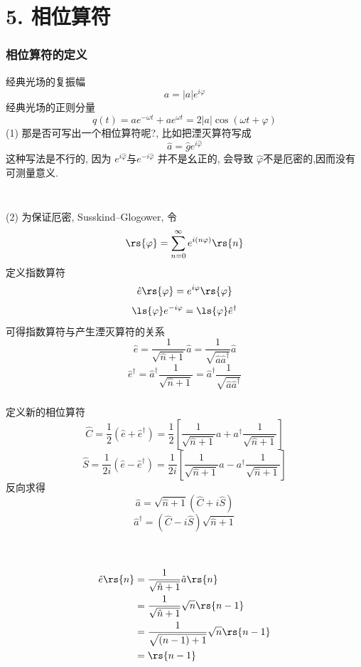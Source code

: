 \section{5. 相位算符}

\begin{frame} 
  \frametitle{相位算符的定义}
       经典光场的复振幅 
       \[ a= \left|a\right| e^{i\varphi}\]
       经典光场的正则分量
       \[ q(t) = a e^{-\omega t} + a e^{\omega t} = 2\left|a \right|\cos(\omega t + \varphi)\]
       (1) 那是否可写出一个相位算符呢?, 比如把湮灭算符写成
       \[ \hat{a} = \hat{g} e ^ {i \hat{\varphi}} \]
       这种写法是不行的, 因为
       $e ^ {i \hat{\varphi}}$与$e ^ {-i \hat{\varphi}}$ 并不是幺正的, 会导致 $\hat{\varphi}$不是厄密的,因而没有可测量意义. 
\end{frame}

\begin{frame} 
    \frametitle{}
    ~\\
       (2) 为保证厄密, Susskind–Glogower, 令
       \[ \rs{\varphi} = \sum_ {n=0} ^ \infty e^{i (n\varphi)} \rs{n} \]
       定义指数算符
       \[ \hat {e} \rs{\varphi}= e^{i {\varphi}}\rs{\varphi} \] 
        \[ \ls{\varphi}  e^{-i {\varphi}} = \ls{\varphi} \hat{e}^{\dagger}\]
      可得指数算符与产生湮灭算符的关系
      \[ \hat {e} = \frac{1}{\sqrt{\hat{n}+1}} \hat {a} =  \frac{1}{\sqrt{\hat {a}\hat {a}^{\dagger}}} \hat {a} \] 
      \[ \hat {e}^{\dagger} = \hat {a}^{\dagger} \frac{1}{\sqrt{\hat{n}+1}} = \hat {a}^{\dagger} \frac{1}{\sqrt{\hat {a}\hat {a}^{\dagger}}}  \] 
\end{frame}

\begin{frame} 
\frametitle{}
定义新的相位算符
\[\hat{C}= \frac{1}{2} (\hat {e} + \hat {e}^{\dagger})=\frac{1}{2}\left[ \frac{1}{\sqrt{\hat{n}+1}}a + a^{\dagger}  \frac{1}{\sqrt{\hat{n}+1}}\right]\]
\[\hat{S}= \frac{1}{2i} (\hat {e} - \hat {e}^{\dagger})=\frac{1}{2i}\left[ \frac{1}{\sqrt{\hat{n}+1}}a - a^{\dagger}  \frac{1}{\sqrt{\hat{n}+1}}\right]\]
       反向求得 
       \[\hat{a}= \sqrt{\hat{n}+1}(\hat{C}+i\hat{S})\]
       \[\hat{a}^{\dagger}= (\hat{C}-i\hat{S})\sqrt{\hat{n}+1}\]
\end{frame}

\begin{frame} 
\frametitle{}
    \例 [6. 试证明指数算符有如下性质]
    {\[ \hat {e} \rs{n} = \rs{n-1}, \qquad \hat {e}^{\dagger} \rs{n} = \rs{n+1}\]}
    \证 ~
    \[ \begin{aligned}
      \hat {e} \rs{n} & = \frac{1}{\sqrt{\hat{n}+1}} \hat {a} \rs{n}\\
      &= \frac{1}{\sqrt{\hat{n}+1}}  \sqrt{n} \rs{n-1} \\
      &= \frac{1}{\sqrt{(n-1)+1}}  \sqrt{n} \rs{n-1}  \\ 
      &= \rs{n-1}
    \end{aligned}\] 
\end{frame}

